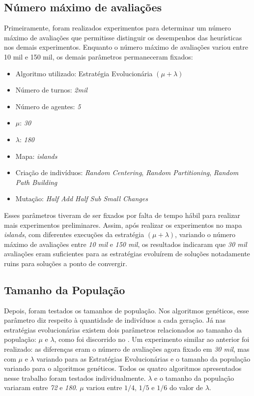 \subsection{Número máximo de avaliações}

Primeiramente, foram realizados experimentos para determinar um número máximo 
de avaliações que permitisse distinguir os desempenhos das heurísticas nos 
demais experimentos. Enquanto o número máximo de avaliações variou entre 10 mil 
e 150 mil, os demais parâmetros permaneceram fixados:

\begin{itemize}
	\item Algoritmo utilizado: Estratégia Evolucionária $(\mu + \lambda)$
	\item Número de turnos: \textit{2mil}
	\item Número de agentes: \textit{5}
	\item $\mu$: \textit{30}
	\item $\lambda$: \textit{180}
	\item Mapa: \textit{islands}
	\item Criação de indivíduos: \textit{Random Centering}, 
	\textit{Random Partitioning}, \textit{Random Path Building}
	\item Mutação: \textit{Half Add Half Sub Small Changes}
\end{itemize}

Esses parâmetros tiveram de ser fixados por falta de tempo hábil para realizar 
mais experimentos preliminares. Assim, após realizar os experimentos no 
mapa \textit{islands}, com diferentes execuções da estratégia $(\mu + \lambda)$, 
variando o número máximo de avaliações entre \textit{10 mil} e \textit{150 mil}, 
os resultados indicaram que \textit{30 mil} avaliações eram suficientes para as 
estratégias evoluírem de soluções notadamente ruins para soluções a ponto de 
convergir.

\subsection{Tamanho da População}

Depois, foram testados os tamanhos de população. Nos algoritmos genéticos, 
esse parâmetro diz respeito à quantidade de indivíduos a cada geração. 
Já nas estratégias evolucionárias existem dois parâmetros relacionados ao 
tamanho da população: $\mu$ e $\lambda$, como foi discorrido no 
. Um experimento similar ao anterior foi realizado: as 
diferenças eram o número de avaliações agora fixado em \textit{30 mil}, mas com 
$\mu$ e $\lambda$ variando para as Estratégias Evolucionárias e o tamanho da 
população variando para o algoritmos genéticos. Todos os quatro algoritmos 
apresentados nesse trabalho foram testados individualmente. $\lambda$ e o 
tamanho da população variaram entre \textit{72} e \textit{180}. $\mu$ variou 
entre $1/4$, $1/5$ e $1/6$ do valor de $\lambda$.


